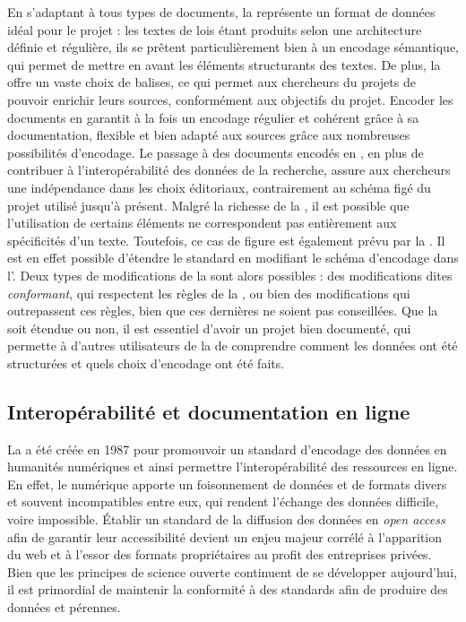 En s'adaptant à tous types de documents, la \TEI représente un format de données idéal pour le projet \COREL : les textes de lois étant produits selon une architecture définie et régulière, ils se prêtent particulièrement bien à un encodage sémantique, qui permet de mettre en avant les éléments structurants des textes. De plus, la \TEI offre un vaste choix de balises, ce qui permet aux chercheurs du projets de pouvoir enrichir leurs sources, conformément aux objectifs du projet. Encoder les documents en \TEI garantit à la fois un encodage régulier et cohérent grâce à sa documentation, flexible et bien adapté aux sources grâce aux nombreuses possibilités d'encodage. Le passage à des documents encodés en \TEI, en plus de contribuer à l'interopérabilité des données de la recherche, assure aux chercheurs une indépendance dans les choix éditoriaux, contrairement au schéma figé du projet \LSC utilisé jusqu'à présent. Malgré la richesse de la \TEI, il est possible que l'utilisation de certains éléments ne correspondent pas entièrement aux spécificités d'un texte. Toutefois, ce cas de figure est également prévu par la \TEI. Il est en effet possible d'étendre le standard en modifiant le schéma d'encodage dans l'\ODD. Deux types de modifications de la \TEI sont alors possibles : des modifications dites \TEI \textit{conformant}, qui respectent les règles de la \TEI, ou bien des modifications qui outrepassent ces règles, bien que ces dernières ne soient pas conseillées. Que la \TEI soit étendue ou non, il est essentiel d'avoir un projet bien documenté, qui permette à d'autres utilisateurs de la \TEI de comprendre comment les données ont été structurées et quels choix d'encodage ont été faits. 

\subsection{Interopérabilité et documentation en ligne}

La \TEI a été créée en 1987 pour promouvoir un standard d'encodage des données en humanités numériques et ainsi permettre l'interopérabilité des ressources en ligne. En effet, le numérique apporte un foisonnement de données et de formats divers et souvent incompatibles entre eux, qui rendent l'échange des données difficile, voire impossible. Établir un standard de la diffusion des données en \textit{open access} afin de garantir leur accessibilité devient un enjeu majeur corrélé à l'apparition du web et à l'essor des formats propriétaires au profit des entreprises privées. Bien que les principes de science ouverte continuent de se développer aujourd'hui, il est primordial de maintenir la conformité à des standards afin de produire des données \fair et pérennes. 

